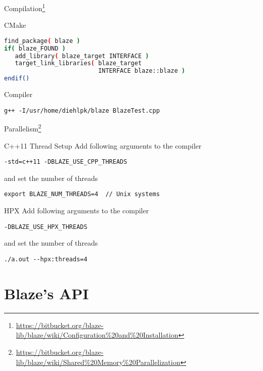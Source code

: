 \documentclass[12pt,t]{beamer}
\begin{document}
\begin{frame}[fragile]{Compilation\footnote{\tiny\url{https://bitbucket.org/blaze-lib/blaze/wiki/Configuration\%20and\%20Installation}}}

\begin{block}{CMake}
\begin{lstlisting}[language=bash]
find_package( blaze )
if( blaze_FOUND )
   add_library( blaze_target INTERFACE )
   target_link_libraries( blaze_target 
                          INTERFACE blaze::blaze )
endif()
\end{lstlisting}
\end{block}

\begin{block}{Compiler}
\begin{lstlisting}
g++ -I/usr/home/diehlpk/blaze BlazeTest.cpp
\end{lstlisting}
\end{block}

\end{frame}


\begin{frame}[fragile]{Parallelism\footnote{\tiny\url{https://bitbucket.org/blaze-lib/blaze/wiki/Shared\%20Memory\%20Parallelization}}}

\begin{block}{C++11 Thread Setup}
Add following arguments to the compiler
\begin{lstlisting}
-std=c++11 -DBLAZE_USE_CPP_THREADS
\end{lstlisting}
and set the number of threads
\begin{lstlisting}
export BLAZE_NUM_THREADS=4  // Unix systems
\end{lstlisting}
\end{block}

\begin{block}{HPX}
Add following arguments to the compiler
\begin{lstlisting}
-DBLAZE_USE_HPX_THREADS
\end{lstlisting}
and set the number of threads
\begin{lstlisting}
./a.out --hpx:threads=4
\end{lstlisting}
\end{block}

\end{frame}

\section{Blaze's API}
\end{document}
